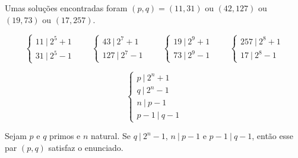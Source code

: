 \documentclass[10pt, a4paper]{article}
\newcommand{\divides}{\ |\ }
\begin{document}
	\setcounter{prob}{10}

	\newpage

	Umas soluções encontradas foram $(p, q) = (11, 31)$ ou $(42, 127)$ ou $(19, 73)$ ou $(17, 257)$.

	\[\begin{cases} 11 \divides 2^5 + 1  \\ 31 \divides 2^5 - 1\end{cases}\qquad
	\begin{cases} 43 \divides 2^7 + 1  \\ 127 \divides 2^7 - 1\end{cases}\qquad
	\begin{cases} 19 \divides 2^9 + 1  \\ 73 \divides 2^9 - 1\end{cases}\qquad
	\begin{cases} 257 \divides 2^8 + 1 \\ 17 \divides 2^8 - 1\end{cases}\]

	\[\begin{cases} p \divides 2^n + 1  \\ q \divides 2^n - 1 \\ n \divides p - 1 \\ p-1 \divides q - 1 \end{cases}\]

	\begin{lem}
		Sejam $p$ e $q$ primos e $n$ natural. Se $q \divides 2^n - 1$, $n \divides p-1$ e $p-1 \divides q-1$, então esse par $(p, q)$ satisfaz o enunciado.
	\end{lem}
\end{document}
